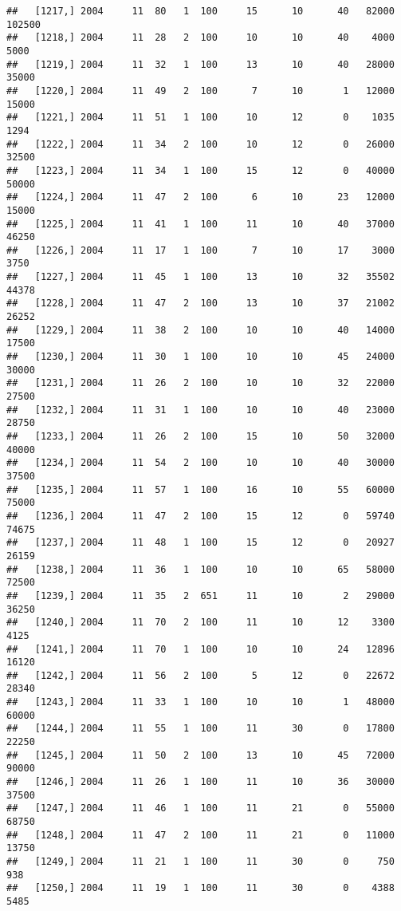 \documentclass{article}\usepackage[]{graphicx}\usepackage[]{color}
\makeatletter
\newenvironment{kframe}{%
 \def\at@end@of@kframe{}%
 \ifinner\ifhmode%
  \def\at@end@of@kframe{\end{minipage}}%
  \begin{minipage}{\columnwidth}%
 \fi\fi%
 \def\FrameCommand##1{\hskip\@totalleftmargin \hskip-\fboxsep
 \colorbox{shadecolor}{##1}\hskip-\fboxsep
     \hskip-\linewidth \hskip-\@totalleftmargin \hskip\columnwidth}%
 \MakeFramed {\advance\hsize-\width
   \@totalleftmargin\z@ \linewidth\hsize
   \@setminipage}}%
 {\par\unskip\endMakeFramed%
 \at@end@of@kframe}
\newenvironment{knitrout}{}{} %
\makeatother
\begin{document}
\begin{knitrout}
\begin{kframe}
\begin{verbatim}
##   [1217,] 2004     11  80   1  100     15      10      40   82000  102500
##   [1218,] 2004     11  28   2  100     10      10      40    4000    5000
##   [1219,] 2004     11  32   1  100     13      10      40   28000   35000
##   [1220,] 2004     11  49   2  100      7      10       1   12000   15000
##   [1221,] 2004     11  51   1  100     10      12       0    1035    1294
##   [1222,] 2004     11  34   2  100     10      12       0   26000   32500
##   [1223,] 2004     11  34   1  100     15      12       0   40000   50000
##   [1224,] 2004     11  47   2  100      6      10      23   12000   15000
##   [1225,] 2004     11  41   1  100     11      10      40   37000   46250
##   [1226,] 2004     11  17   1  100      7      10      17    3000    3750
##   [1227,] 2004     11  45   1  100     13      10      32   35502   44378
##   [1228,] 2004     11  47   2  100     13      10      37   21002   26252
##   [1229,] 2004     11  38   2  100     10      10      40   14000   17500
##   [1230,] 2004     11  30   1  100     10      10      45   24000   30000
##   [1231,] 2004     11  26   2  100     10      10      32   22000   27500
##   [1232,] 2004     11  31   1  100     10      10      40   23000   28750
##   [1233,] 2004     11  26   2  100     15      10      50   32000   40000
##   [1234,] 2004     11  54   2  100     10      10      40   30000   37500
##   [1235,] 2004     11  57   1  100     16      10      55   60000   75000
##   [1236,] 2004     11  47   2  100     15      12       0   59740   74675
##   [1237,] 2004     11  48   1  100     15      12       0   20927   26159
##   [1238,] 2004     11  36   1  100     10      10      65   58000   72500
##   [1239,] 2004     11  35   2  651     11      10       2   29000   36250
##   [1240,] 2004     11  70   2  100     11      10      12    3300    4125
##   [1241,] 2004     11  70   1  100     10      10      24   12896   16120
##   [1242,] 2004     11  56   2  100      5      12       0   22672   28340
##   [1243,] 2004     11  33   1  100     10      10       1   48000   60000
##   [1244,] 2004     11  55   1  100     11      30       0   17800   22250
##   [1245,] 2004     11  50   2  100     13      10      45   72000   90000
##   [1246,] 2004     11  26   1  100     11      10      36   30000   37500
##   [1247,] 2004     11  46   1  100     11      21       0   55000   68750
##   [1248,] 2004     11  47   2  100     11      21       0   11000   13750
##   [1249,] 2004     11  21   1  100     11      30       0     750     938
##   [1250,] 2004     11  19   1  100     11      30       0    4388    5485

\end{verbatim}
\end{kframe}
\end{knitrout}
\end{document}
